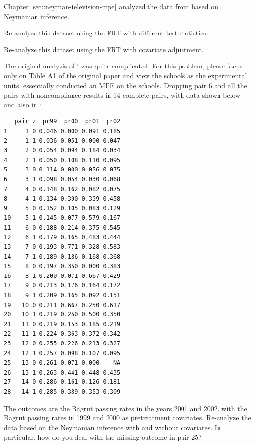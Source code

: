 \begin{HomeworkProblem}\label{exr:7-7}

Chapter \ref{sec::neyman-television-mpe} analyzed the data from based on Neymanian inference.

Re-analyze this dataset using the FRT with different test statistics.

Re-analyze this dataset using the FRT with covariate adjustment.




\end{HomeworkProblem}

\begin{HomeworkProblem}\label{exr:7-8}

The original analysis of \citet{angrist2009effects}' was quite complicated. For this problem, please focus only on Table A1 of the original paper and view the schools as the experimental units. \citet{angrist2009effects} essentially conducted an MPE on the schools. Dropping pair 6 and all the pairs with noncompliance results in 14 complete pairs, with data shown below and also in :
\begin{lstlisting}
   pair z  pr99  pr00  pr01  pr02
1     1 0 0.046 0.000 0.091 0.185
2     1 1 0.036 0.051 0.000 0.047
3     2 0 0.054 0.094 0.184 0.034
4     2 1 0.050 0.108 0.110 0.095
5     3 0 0.114 0.000 0.056 0.075
6     3 1 0.098 0.054 0.030 0.068
7     4 0 0.148 0.162 0.082 0.075
8     4 1 0.134 0.390 0.339 0.458
9     5 0 0.152 0.105 0.083 0.129
10    5 1 0.145 0.077 0.579 0.167
11    6 0 0.188 0.214 0.375 0.545
12    6 1 0.179 0.165 0.483 0.444
13    7 0 0.193 0.771 0.328 0.583
14    7 1 0.189 0.186 0.168 0.368
15    8 0 0.197 0.350 0.000 0.383
16    8 1 0.200 0.071 0.667 0.429
17    9 0 0.213 0.176 0.164 0.172
18    9 1 0.209 0.165 0.092 0.151
19   10 0 0.211 0.667 0.250 0.617
20   10 1 0.219 0.250 0.500 0.350
21   11 0 0.219 0.153 0.185 0.219
22   11 1 0.224 0.363 0.372 0.342
23   12 0 0.255 0.226 0.213 0.327
24   12 1 0.257 0.098 0.107 0.095
25   13 0 0.261 0.071 0.000    NA
26   13 1 0.263 0.441 0.448 0.435
27   14 0 0.286 0.161 0.126 0.181
28   14 1 0.285 0.389 0.353 0.309
\end{lstlisting}
The outcomes are the Bagrut passing rates in the years 2001 and 2002, with the Bagrut passing rates in 1999 and 2000 as pretreatment covariates. Re-analyze the data based on the Neymanian inference with and without covariates. In particular, how do you deal with the missing outcome in pair 25?


\end{HomeworkProblem}

